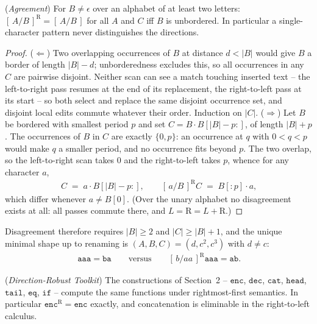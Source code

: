 \documentclass[runningheads,envcountsect]{llncs}
\renewenvironment{remark}
  {\rmfamily\trivlist\item[\hskip\labelsep{\itshape Remark.}]\ignorespaces}
  {\endtrivlist}
\begin{document}
\begin{proposition}
    (\emph{Agreement})
    \label{prop:r2l-agree}
    For $B \neq \epsilon$ over an alphabet of at least two letters: $[\,A/B\,]^{\mathrm{R}} = [\,A/B\,]$ for all $A$ and $C$ iff $B$ is unbordered. In particular a single-character pattern never distinguishes the directions.
\end{proposition}

\begin{proof}
    ($\Leftarrow$) Two overlapping occurrences of $B$ at distance $d < |B|$ would give $B$ a border of length $|B|-d$; unborderedness excludes this, so all occurrences in any $C$ are pairwise disjoint. Neither scan can see a match touching inserted text -- the left-to-right pass resumes at the end of its replacement, the right-to-left pass at its start -- so both select and replace the same disjoint occurrence set, and disjoint local edits commute whatever their order. Induction on $|C|$.
    ($\Rightarrow$) Let $B$ be bordered with smallest period $p$ and set $C = B \cdot B[|B|{-}p:]$, of length $|B| + p$. The occurrences of $B$ in $C$ are exactly $\{0, p\}$: an occurrence at $q$ with $0 < q < p$ would make $q$ a smaller period, and no occurrence fits beyond $p$. The two overlap, so the left-to-right scan takes $0$ and the right-to-left takes $p$, whence for any character $a$,
    \begin{align*}
        [\,a/B\,]\,C \;=\; a \cdot B[|B|{-}p:], \qquad [\,a/B\,]^{\mathrm{R}} C \;=\; B[:p] \cdot a,
    \end{align*}
    which differ whenever $a \neq B[0]$. (Over the unary alphabet no disagreement exists at all: all passes commute there, and $L = \mathrm{R} = L{+}\mathrm{R}$.)
\end{proof}

\begin{remark}
    \label{rem:minwitness}
    Disagreement therefore requires $|B| \geq 2$ and $|C| \geq |B|+1$, and the unique minimal shape up to renaming is $(A, B, C) = (d, c^2, c^3)$ with $d \neq c$:
    \begin{align*}
        [\,b/aa\,]\,\mathtt{aaa} = \mathtt{ba} \qquad\text{versus}\qquad [\,b/aa\,]^{\mathrm{R}} \mathtt{aaa} = \mathtt{ab}.
    \end{align*}

\end{remark}

\begin{theorem}
    (\emph{Direction-Robust Toolkit})
    \label{thm:r2l-toolkit}
    The constructions of Section~2 -- $\mathtt{enc}$, $\mathtt{dec}$, $\mathtt{cat}$, $\mathtt{head}$, $\mathtt{tail}$, $\mathtt{eq}$, $\mathtt{if}$ -- compute the same functions under rightmost-first semantics. In particular $\mathtt{enc}^{\mathrm{R}} = \mathtt{enc}$ exactly, and concatenation is eliminable in the right-to-left calculus.
\end{theorem}
\end{document}

